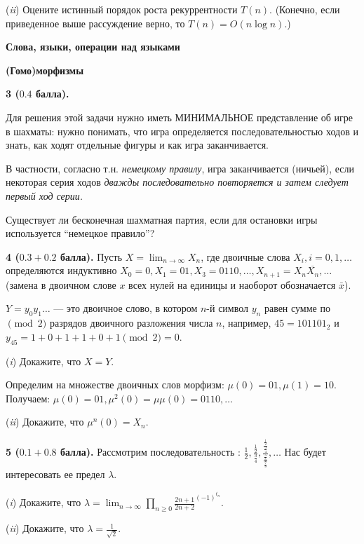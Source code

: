 \documentclass[10pt,twocolumn]{article}
\begin{document}
{\noindent ({\em ii}) Оцените истинный порядок роста рекуррентности $T(n)$.
(Конечно, если приведенное выше рассуждение верно, то $T(n) = O(n\log n)$.)


\medskip

\centerline{\bf Слова, языки, операции над языками} 
\centerline{\bf (Гомо)морфизмы}

\smallskip



{\bf 3 ($0.4$ балла).} 
{\footnotesize Для решения этой задачи нужно иметь МИНИМАЛЬНОЕ представление 
об игре в шахматы: нужно понимать, что игра определяется
последовательностью ходов и знать, как ходят отдельные фигуры и как игра заканчивается. 

В частности, согласно т.н. {\em немецкому правилу}, игра 
заканчивается (ничьей), если 
некоторая серия ходов {\em дважды последовательно 
повторяется и затем следует первый ход серии.}
}

Существует ли бесконечная шахматная партия, если для остановки игры
используется ``немецкое правило''?
\smallskip





{\bf 4 ($0.3+0.2$ балла).} 
Пусть $X=\lim_{n\to \infty} X_n$, где двоичные слова $X_i, i=0,1,\dots$
определяются индуктивно $X_0=0, X_1=01, 
X_3=0110,\dots, X_{n+1}=X_n\overline{X_n},\dots$ (замена 
в двоичном слове $x$ всех нулей на 
единицы и наоборот обозначается $\bar x$).

$Y=y_0y_1\dots$ --- это двоичное слово, в котором 
$n$-й символ $y_n$ равен сумме по $\pmod{2}$ разрядов двоичного 
разложения числа $n$, например, $45=101101_2$ и $y_{45}=1+0+1+1+0+1 
\pmod{2}=0$.

\noindent ({\em i})  Докажите, что $X=Y$.

Определим на множестве двоичных слов морфизм:
$\mu(0)=01, \mu(1)=10$. Получаем: $\mu(0)=01, \mu^2(0)=\mu\mu(0)=
0110,\dots$ 

\noindent ({\em ii})  Докажите, что $\mu^n(0)=X_n$.

\smallskip

{\bf 5 ($0.1+0.8$ балла).} Рассмотрим последовательность : $\frac12,
 \frac{\frac12}{\frac34}, 
\frac{\frac{\frac12}{\frac34}}{\frac{\frac56}{\frac78}},\dots$
Нас будет интересовать ее предел $\lambda$.

\noindent ({\em i}) Докажите, что $\lambda=\lim_{n\to \infty} 
\prod_{n\geq 0}{\frac{2n+1}{2n+2}^{(-1)^{t_n}}}$.

\noindent ({\em ii}) Докажите, что $\lambda=\frac1{\sqrt2}$.






}
\end{document}
